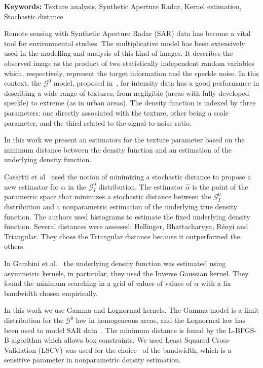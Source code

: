 \documentclass[a4paper]{article} %
\def\keywords#1{{\bf Keywords: }{#1}}
\begin{document}
\keywords{Texture analysis, Synthetic Aperture Radar, Kernel estimation, Stochastic distance}

\vspace{0.5cm}
Remote sensing with Synthetic Aperture Radar (SAR) data has become a vital tool for environmental studies. 
The multiplicative model has been extensively used in the modelling and analysis of this kind of images. 
It describes the observed image as the product of two statistically independent random variables which, respectively, represent the target information and the speckle noise. 
In this context, the $\mathcal{G}^{0}$ model, proposed in~\cite{Frery97}, for intensity data has a good performance in describing a wide range of textures, from negligible (areas with fully developed speckle) to extreme (as in urban areas). 
The density function is indexed by three parameters: one directly associated with the texture, other being a scale parameter, and the third related to the signal-to-noise ratio.

In this work we present an estimators for the texture parameter based on the minimum distance between the density function and an estimation of the underlying density function.

Cassetti et al~\cite{APSAR2013ParameterEstimationStochasticDistances} used the notion of minimizing a stochastic distance to propose a new estimator for $\alpha$ in the $\mathcal{G}_I^0$ distribution.
The estimator $\widehat{\alpha}$ is the point of the parametric space that minimizes a stochastic distance between the $\mathcal{G}_I^0$ distribution and a nonparametric estimation of the underlying true density function. 
The authors used histograms to estimate the fixed underlying density function. Several distances were assessed: Hellinger, Bhattacharyya, R\'enyi and Triangular. They chose the Triangular distance because it outperformed the others. 

In Gambini et al.~\cite{gambini2015} the underlying density function was estimated using asymmetric kernels, in particular, they used the Inverse Gaussian kernel. 
They found the minimum searching in a grid of values of values of $\alpha$ with a fix bandwidth chosen empirically.

In this work we use Gamma and Lognormal kernels.
The Gamma model is a limit distribution for the $\mathcal{G}^0$ law in homogeneous areas, and the Lognormal law has been used to model SAR data~\cite{Szajnowski1977}. 
The minimum distance is found by the L-BFGS-B algorithm which allows box constraints. 
We used Least Squared Cross-Validation (LSCV) was used for the choice~\cite{Rudemo1982} of the bandwidth, which is a sensitive parameter in nonparametric density estimation. 
\end{document}
